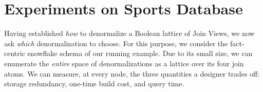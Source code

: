 \documentclass[sigconf]{acmart}
\begin{document}

\section{Experiments on Sports Database}\label{sec:case-exp}

Having established \emph{how} to denormalize a Boolean lattice of Join Views, we now ask \emph{which} denormalization to choose. For this purpose, we consider the fact-centric snowflake schema of our running example. Due to its small size, we can enumerate the \emph{entire} space of denormalizations as a lattice over its four join atoms. We can measure, at every node, the three quantities a designer trades off: storage redundancy, one-time build cost, and query time.

\end{document}
